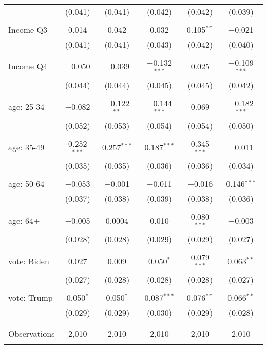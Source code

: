 \begin{tabular}{@{\extracolsep{5pt}}lccccc}
  & (0.041) & (0.041) & (0.042) & (0.042) & (0.039) \\ 
  & & & & & \\ 
 Income Q3 & 0.014 & 0.042 & 0.032 & 0.105$^{**}$ & $-$0.021 \\ 
  & (0.041) & (0.041) & (0.043) & (0.042) & (0.040) \\ 
  & & & & & \\ 
 Income Q4 & $-$0.050 & $-$0.039 & $-$0.132$^{***}$ & 0.025 & $-$0.109$^{***}$ \\ 
  & (0.044) & (0.044) & (0.045) & (0.045) & (0.042) \\ 
  & & & & & \\ 
 age: 25-34 & $-$0.082 & $-$0.122$^{**}$ & $-$0.144$^{***}$ & 0.069 & $-$0.182$^{***}$ \\ 
  & (0.052) & (0.053) & (0.054) & (0.054) & (0.050) \\ 
  & & & & & \\ 
 age: 35-49 & 0.252$^{***}$ & 0.257$^{***}$ & 0.187$^{***}$ & 0.345$^{***}$ & $-$0.011 \\ 
  & (0.035) & (0.035) & (0.036) & (0.036) & (0.034) \\ 
  & & & & & \\ 
 age: 50-64 & $-$0.053 & $-$0.001 & $-$0.011 & $-$0.016 & 0.146$^{***}$ \\ 
  & (0.037) & (0.038) & (0.039) & (0.038) & (0.036) \\ 
  & & & & & \\ 
 age: 64+ & $-$0.005 & 0.0004 & 0.010 & 0.080$^{***}$ & $-$0.003 \\ 
  & (0.028) & (0.028) & (0.029) & (0.029) & (0.027) \\ 
  & & & & & \\ 
 vote: Biden & 0.027 & 0.009 & 0.050$^{*}$ & 0.079$^{***}$ & 0.063$^{**}$ \\ 
  & (0.027) & (0.028) & (0.028) & (0.028) & (0.027) \\ 
  & & & & & \\ 
 vote: Trump & 0.050$^{*}$ & 0.050$^{*}$ & 0.087$^{***}$ & 0.076$^{**}$ & 0.066$^{**}$ \\ 
  & (0.029) & (0.029) & (0.030) & (0.029) & (0.028) \\ 
  & & & & & \\ 
\hline \\[-1.8ex] 

Observations & 2,010 & 2,010 & 2,010 & 2,010 & 2,010 \\ 
\hline 
\hline \\[-1.8ex] 
\end{tabular} 